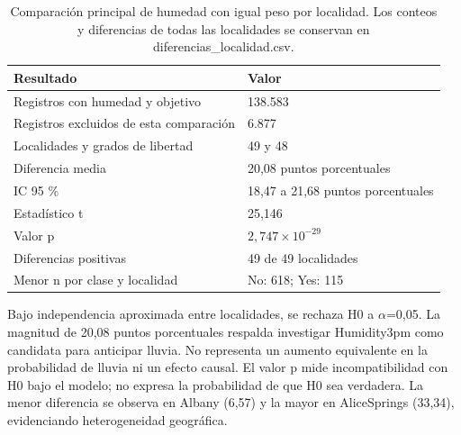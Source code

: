 \documentclass[11pt,a4paper]{article}
\begin{document}
\begin{table}[H]
\centering
\small
\renewcommand{\arraystretch}{1.18}
\setlength{\tabcolsep}{5pt}
\begin{tabularx}{\linewidth}{@{}Y C{6.5cm}@{}}
\toprule

\textbf{Resultado} & \textbf{Valor} \\
\midrule

Registros con humedad y objetivo & 138.583 \\

Registros excluidos de esta comparación & 6.877 \\

Localidades y grados de libertad & 49 y 48 \\

Diferencia media & 20,08 puntos porcentuales \\

IC 95 \% & 18,47 a 21,68 puntos porcentuales \\

Estadístico t & 25,146 \\

Valor p & \(2{,}747\times10^{-29}\) \\

Diferencias positivas & 49 de 49 localidades \\

Menor n por clase y localidad & No: 618; Yes: 115 \\

\bottomrule
\end{tabularx}

\caption{Comparación principal de humedad con igual peso por localidad. Los conteos y diferencias de todas las localidades se conservan en diferencias\_localidad.csv.}
\label{tab:7}

\end{table}

Bajo independencia aproximada entre localidades, se rechaza H0 a \(\alpha\)=0,05. La magnitud de 20,08 puntos porcentuales respalda investigar Humidity3pm como candidata para anticipar lluvia. No representa un aumento equivalente en la probabilidad de lluvia ni un efecto causal. El valor p mide incompatibilidad con H0 bajo el modelo; no expresa la probabilidad de que H0 sea verdadera. La menor diferencia se observa en Albany (6,57) y la mayor en AliceSprings (33,34), evidenciando heterogeneidad geográfica.


\clearpage


\end{document}
